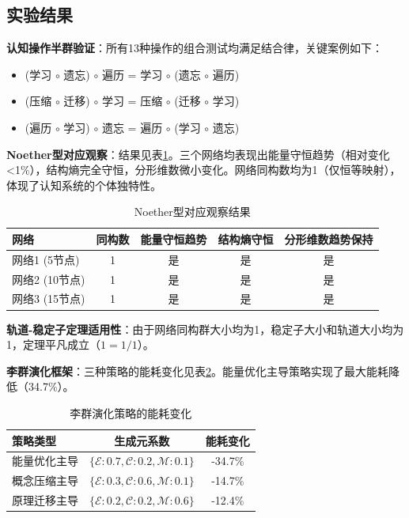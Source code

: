 \documentclass[12pt,a4paper]{article}
\begin{document}
\subsection{实验结果}

\textbf{认知操作半群验证}：所有13种操作的组合测试均满足结合律，关键案例如下：
\begin{itemize}
    \item (学习 $\circ$ 遗忘) $\circ$ 遍历 = 学习 $\circ$ (遗忘 $\circ$ 遍历)
    \item (压缩 $\circ$ 迁移) $\circ$ 学习 = 压缩 $\circ$ (迁移 $\circ$ 学习)
    \item (遍历 $\circ$ 学习) $\circ$ 遗忘 = 遍历 $\circ$ (学习 $\circ$ 遗忘)
\end{itemize}

\textbf{Noether型对应观察}：结果见表\ref{tab:app_noether}。三个网络均表现出能量守恒趋势（相对变化<1\%），结构熵完全守恒，分形维数微小变化。网络同构数均为1（仅恒等映射），体现了认知系统的个体独特性。

\begin{table}[H]
\centering
\caption{Noether型对应观察结果}
\label{tab:app_noether}
\begin{tabular}{lcccc}
\toprule
\textbf{网络} & \textbf{同构数} & \textbf{能量守恒趋势} & \textbf{结构熵守恒} & \textbf{分形维数趋势保持} \\
\midrule
网络1 (5节点) & 1 & 是 & 是 & 是 \\
网络2 (10节点) & 1 & 是 & 是 & 是 \\
网络3 (15节点) & 1 & 是 & 是 & 是 \\
\bottomrule
\end{tabular}
\end{table}

\textbf{轨道-稳定子定理适用性}：由于网络同构群大小均为1，稳定子大小和轨道大小均为1，定理平凡成立（$1 = 1/1$）。

\textbf{李群演化框架}：三种策略的能耗变化见表\ref{tab:app_lie}。能量优化主导策略实现了最大能耗降低（34.7\%）。

\begin{table}[H]
\centering
\caption{李群演化策略的能耗变化}
\label{tab:app_lie}
\begin{tabular}{lcc}
\toprule
\textbf{策略类型} & \textbf{生成元系数} & \textbf{能耗变化} \\
\midrule
能量优化主导 & $\{\mathcal{E}:0.7, \mathcal{C}:0.2, \mathcal{M}:0.1\}$ & -34.7\% \\
概念压缩主导 & $\{\mathcal{E}:0.3, \mathcal{C}:0.6, \mathcal{M}:0.1\}$ & -14.7\% \\
原理迁移主导 & $\{\mathcal{E}:0.2, \mathcal{C}:0.2, \mathcal{M}:0.6\}$ & -12.4\% \\
\bottomrule
\end{tabular}
\end{table}
\end{document}
